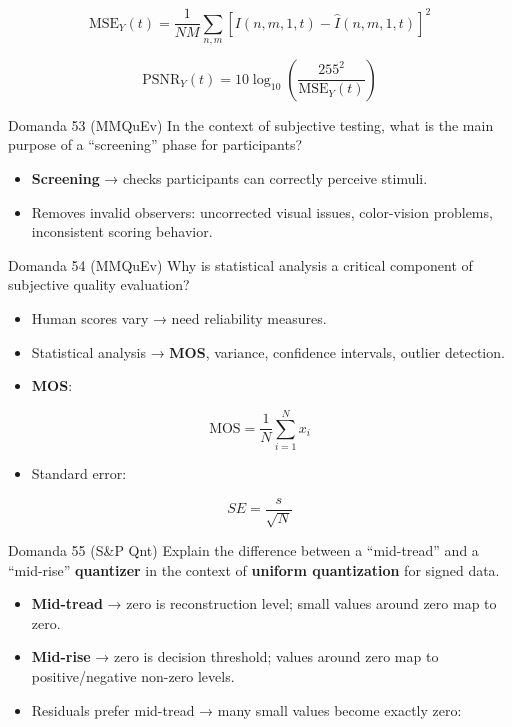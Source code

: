 $$
\text{MSE}_Y(t)=\frac{1}{NM}\sum_{n,m}[I(n,m,1,t)-\hat{I}(n,m,1,t)]^2
$$



$$
\text{PSNR}_Y(t)=10\log_{10}\left(\frac{255^2}{\text{MSE}_Y(t)}\right)
$$




\begin{questionbox}{Domanda 53}
(MMQuEv) In the context of subjective testing, what is the main purpose of a “screening” phase for participants?
\end{questionbox}


\begin{itemize}
  \item \textbf{Screening} → checks participants can correctly perceive stimuli.
  \item Removes invalid observers: uncorrected visual issues, color-vision problems, inconsistent scoring behavior.
\end{itemize}



\begin{questionbox}{Domanda 54}
(MMQuEv) Why is statistical analysis a critical component of subjective quality evaluation?
\end{questionbox}


\begin{itemize}
  \item Human scores vary → need reliability measures.
  \item Statistical analysis → \textbf{MOS}, variance, confidence intervals, outlier detection.
  \item \textbf{MOS}:
\end{itemize}


$$
\text{MOS}=\frac{1}{N}\sum_{i=1}^{N}x_i
$$


\begin{itemize}
  \item Standard error:
\end{itemize}


$$
SE=\frac{s}{\sqrt{N}}
$$




\begin{questionbox}{Domanda 55}
(S\&P Qnt) Explain the difference between a “mid-tread” and a “mid-rise” \textbf{quantizer} in the context of \textbf{uniform \textbf{quantization}} for signed data.
\end{questionbox}


\begin{itemize}
  \item \textbf{Mid-tread} → zero is reconstruction level; small values around zero map to zero.
  \item \textbf{Mid-rise} → zero is decision threshold; values around zero map to positive/negative non-zero levels.
  \item Residuals prefer mid-tread → many small values become exactly zero:
\end{itemize}


